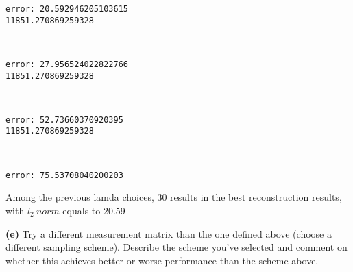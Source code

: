 \documentclass[11pt]{article}
\begin{document}
    \begin{Verbatim}[commandchars=\\\{\}]
error: 20.592946205103615
11851.270869259328

    \end{Verbatim}

    \begin{center}
    \end{center}
    { \hspace*{\fill} \\}
    
    \begin{Verbatim}[commandchars=\\\{\}]
error: 27.956524022822766
11851.270869259328

    \end{Verbatim}

    \begin{center}
    \end{center}
    { \hspace*{\fill} \\}
    
    \begin{Verbatim}[commandchars=\\\{\}]
error: 52.73660370920395
11851.270869259328

    \end{Verbatim}

    \begin{center}
    \end{center}
    { \hspace*{\fill} \\}
    
    \begin{Verbatim}[commandchars=\\\{\}]
error: 75.53708040200203

    \end{Verbatim}

    Among the previous lamda choices, 30 results in the best reconstruction
results, with \(l_2\: norm\) equals to 20.59

    \textbf{(e)} Try a different measurement matrix than the one defined
above (choose a different sampling scheme). Describe the scheme you've
selected and comment on whether this achieves better or worse
performance than the scheme above.
\end{document}
